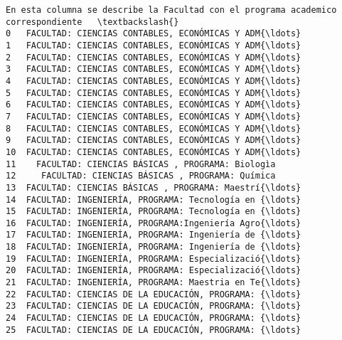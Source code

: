 \documentclass[11pt]{article}
\begin{document}
    \begin{Verbatim}[commandchars=\\\{\}]
   En esta columna se describe la Facultad con el programa academico correspondiente   \textbackslash{}
0   FACULTAD: CIENCIAS CONTABLES, ECONÓMICAS Y ADM{\ldots}                                   
1   FACULTAD: CIENCIAS CONTABLES, ECONÓMICAS Y ADM{\ldots}                                   
2   FACULTAD: CIENCIAS CONTABLES, ECONÓMICAS Y ADM{\ldots}                                   
3   FACULTAD: CIENCIAS CONTABLES, ECONÓMICAS Y ADM{\ldots}                                   
4   FACULTAD: CIENCIAS CONTABLES, ECONÓMICAS Y ADM{\ldots}                                   
5   FACULTAD: CIENCIAS CONTABLES, ECONÓMICAS Y ADM{\ldots}                                   
6   FACULTAD: CIENCIAS CONTABLES, ECONÓMICAS Y ADM{\ldots}                                   
7   FACULTAD: CIENCIAS CONTABLES, ECONÓMICAS Y ADM{\ldots}                                   
8   FACULTAD: CIENCIAS CONTABLES, ECONÓMICAS Y ADM{\ldots}                                   
9   FACULTAD: CIENCIAS CONTABLES, ECONÓMICAS Y ADM{\ldots}                                   
10  FACULTAD: CIENCIAS CONTABLES, ECONÓMICAS Y ADM{\ldots}                                   
11    FACULTAD: CIENCIAS BÁSICAS , PROGRAMA: Biologìa                                   
12     FACULTAD: CIENCIAS BÁSICAS , PROGRAMA: Química                                   
13  FACULTAD: CIENCIAS BÁSICAS , PROGRAMA: Maestrí{\ldots}                                   
14  FACULTAD: INGENIERÍA, PROGRAMA: Tecnología en {\ldots}                                   
15  FACULTAD: INGENIERÍA, PROGRAMA: Tecnología en {\ldots}                                   
16  FACULTAD: INGENIERÍA, PROGRAMA:Ingeniería Agro{\ldots}                                   
17  FACULTAD: INGENIERÍA, PROGRAMA: Ingeniería de {\ldots}                                   
18  FACULTAD: INGENIERÍA, PROGRAMA: Ingeniería de {\ldots}                                   
19  FACULTAD: INGENIERÍA, PROGRAMA: Especializació{\ldots}                                   
20  FACULTAD: INGENIERÍA, PROGRAMA: Especializació{\ldots}                                   
21  FACULTAD: INGENIERÍA, PROGRAMA: Maestria en Te{\ldots}                                   
22  FACULTAD: CIENCIAS DE LA EDUCACIÓN, PROGRAMA: {\ldots}                                   
23  FACULTAD: CIENCIAS DE LA EDUCACIÓN, PROGRAMA: {\ldots}                                   
24  FACULTAD: CIENCIAS DE LA EDUCACIÓN, PROGRAMA: {\ldots}                                   
25  FACULTAD: CIENCIAS DE LA EDUCACIÓN, PROGRAMA: {\ldots}                                   

\end{Verbatim}
\end{document}
